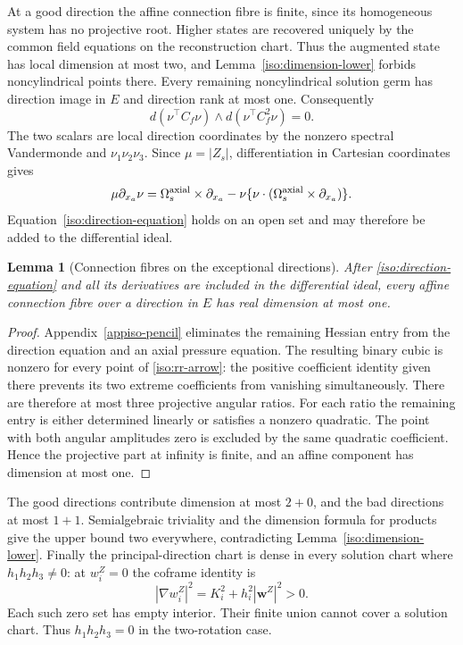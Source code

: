 \documentclass[11pt,a4paper]{article}
\numberwithin{equation}{section}
\theoremstyle{plain}
\newtheorem{lemma}[theorem]{Lemma}
\theoremstyle{definition}
\theoremstyle{remark}
\begin{document}
At a good direction the affine connection fibre is finite, since its
homogeneous system has no projective root.  Higher states are recovered
uniquely by the common field equations on the reconstruction chart.  Thus the augmented state
has local dimension at most two, and Lemma~\ref{iso:dimension-lower} forbids
noncylindrical points there.  Every remaining noncylindrical solution germ
has direction image in $E$ and direction rank at most one.  Consequently
\begin{equation}\label{iso:direction-equation}
 d(\nu^{\top} C_f\nu)\wedge d(\nu^{\top} C_f^2\nu)=0.
\end{equation}
The two scalars are local direction coordinates by the nonzero spectral
Vandermonde and $\nu_1\nu_2\nu_3$. Since $\mu=|Z_s|$, differentiation in
Cartesian coordinates gives
\[
 \mu\partial_{x_a}\nu=\Omega_s^{\rm axial}\times\partial_{x_a}
 -\nu\{\nu\cdot(\Omega_s^{\rm axial}\times\partial_{x_a})\}.
\]
Equation~\eqref{iso:direction-equation} holds on an open set and may therefore be added to the
differential ideal.

\begin{lemma}[Connection fibres on the exceptional directions]
\label{iso:rr-bad-fibres}
After \eqref{iso:direction-equation} and all its derivatives are
included in the differential ideal, every affine connection fibre over
a direction in $E$ has real dimension at most one.
\end{lemma}
\begin{proof}
Appendix~\ref{appiso-pencil} eliminates the remaining Hessian entry
from the direction equation and an axial pressure equation.
The resulting binary cubic is nonzero for every point of
\eqref{iso:rr-arrow}: the positive coefficient identity given there
prevents its two extreme coefficients from vanishing simultaneously.
There are therefore at most three projective angular ratios.
For each ratio the remaining entry is either determined linearly
or satisfies a nonzero quadratic. The point with both angular
amplitudes zero is excluded by the same quadratic coefficient.
Hence the projective part at infinity is finite, and an affine
component has dimension at most one.
\end{proof}

The good directions contribute dimension at most $2+0$, and the bad
directions at most $1+1$. Semialgebraic triviality and the dimension
formula for products \cite[Theorem~9.3.2 and Proposition~2.8.5]{BochnakCosteRoy1998} give
the upper bound two everywhere, contradicting
Lemma~\ref{iso:dimension-lower}.  Finally the principal-direction chart is
dense in every solution chart where $h_1h_2h_3\ne0$: at $w_i^Z=0$ the coframe
identity is
\[
 |\nabla w_i^Z|^2=K_i^2+h_i^2|\mathbf w^Z|^2>0.
\]
Each such zero set has empty interior.  Their finite union cannot cover
a solution chart.  Thus $h_1h_2h_3=0$ in the two-rotation case.
\end{document}
